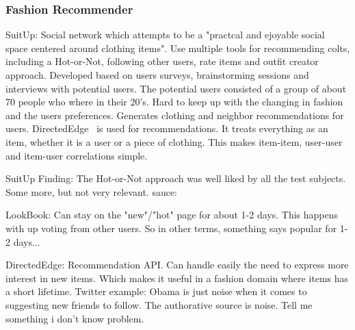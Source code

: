 \subsubsection{Fashion Recommender}

SuitUp:
Social network which attempts to be a "practcal and ejoyable social space centered around clothing items".
Use multiple tools for recommending colts, including a Hot-or-Not, following other users, rate items and outfit creator approach.
Developed based on users surveys, brainstorming sessions and interviews with potential users.
The potential users consisted of a group of about 70 people who where in their 20's.
Hard to keep up with the changing in fashion and the users preferences.
Generates clothing and neighbor recommendations for users.
DirectedEdge~\cite{direcetedEdge} is used for recommendations.
It treats everything as an item, whether it is a user or a piece of clothing.
This makes item-item, user-user and item-user correlations simple.

SuitUp Finding:
The Hot-or-Not approach was well liked by all the test subjects.
Some more, but not very relevant.
sauce:\cite{SuitUp}


LookBook:
Can stay on the "new"/"hot" page for about 1-2 days.
This happens with up voting from other users.
So in other terms, something says popular for 1-2 days...


DirectedEdge:
Recommendation API.
Can handle easily the need to express more interest in new items.
Which makes it useful in a fashion domain where items has a short lifetime.
Twitter example:
Obama is just noise when it comes to suggesting new friends to follow.
The authorative source is noise.
Tell me something i don't know problem.






